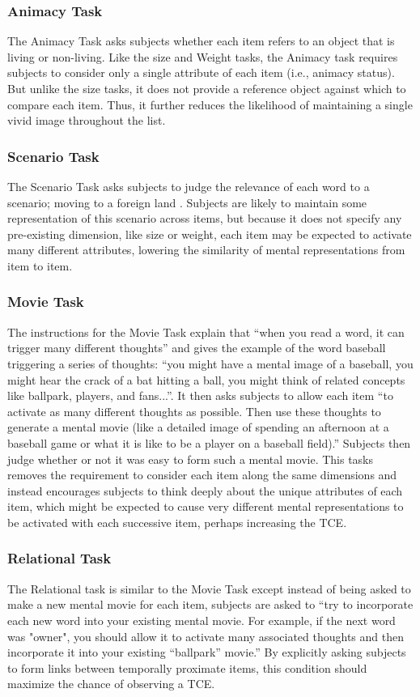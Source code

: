 \documentclass[jou,natbib]{apa6} %
\begin{document}
\subsubsection{Animacy Task} The Animacy Task asks subjects whether each item refers to an object that is living or non-living. Like the size and Weight tasks, the Animacy task requires subjects to consider only a single attribute of each item (i.e., animacy status). But unlike the size tasks, it does not provide a reference object against which to compare each item. Thus, it further reduces the likelihood of maintaining a single vivid image throughout the list. 

\subsubsection{Scenario Task} The Scenario Task asks subjects to judge the relevance of each word to a scenario; moving to a foreign land \citep{NairEtal16}. Subjects are likely to maintain some representation of this scenario across items, but because it does not specify any pre-existing dimension, like size or weight, each item may be expected to activate many different attributes, lowering the similarity of mental representations from item to item.

\subsubsection{Movie Task} The instructions for the Movie Task explain that ``when you read a word, it can trigger many different thoughts'' and gives the example of the word baseball triggering a series of thoughts: ``you might have a mental image of a baseball, you might hear the crack of a bat hitting a ball, you might think of related concepts like ballpark, players, and fans...''. It then asks subjects to allow each item ``to activate as many different thoughts as possible. Then use these thoughts to generate a mental movie (like a detailed image of spending an afternoon at a baseball game or what it is like to be a player on a baseball field).'' Subjects then judge whether or not it was easy to form such a mental movie. This tasks removes the requirement to consider each item along the same dimensions and instead encourages subjects to think deeply about the unique attributes of each item, which might be expected to cause very different mental representations to be activated with each successive item, perhaps increasing the TCE. 

\subsubsection{Relational Task} The Relational task is similar to the Movie Task except instead of being asked to make a new mental movie for each item, subjects are asked to ``try to incorporate each new word into your existing mental movie. For example, if the next word was "owner", you should allow it to activate many associated thoughts and then incorporate it into your existing ``ballpark'' movie.'' By explicitly asking subjects to form links between temporally proximate items, this condition should maximize the chance of observing a TCE. 
\end{document}
